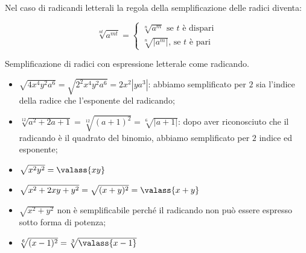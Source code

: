 Nel caso di radicandi letterali la regola della semplificazione delle radici 
diventa:

\begin{proposizione}
 \[\sqrt[nt]{a^{mt}}=\left\{\begin{array}{l}
   \sqrt[n]{a^m} \text{ se }t \text{ è dispari}\\
   \sqrt[n]{\left|a^m\right|}\text{, se }t\text{ è pari}
 \end{array}\right.\]
\end{proposizione}

\begin{exrig}
 \begin{esempio}
Semplificazione di radici con espressione letterale come radicando.
\begin{itemize}
\item $\sqrt{4x^4y^2a^6}=\sqrt{2^2x^4y^2a^6}=2x^2\left|ya^3\right|$: 
 abbiamo semplificato per $2$ sia l'indice della radice che l'esponente del 
 radicando;
\item $\sqrt[12]{a^2+2a+1}=\sqrt[12]{(a+1)^2}=\sqrt[6]{\left|a+1\right|}$: 
 dopo aver riconosciuto che il radicando è il quadrato del binomio, 
 abbiamo semplificato per $2$ indice ed esponente;
\item $\sqrt{x^2y^2}=\valass{xy}$
\item $\sqrt{x^2+2xy+y^2}=\sqrt{(x+y)^2}=\valass{x+y}$
\item $\sqrt{x^2+y^2}$ non è semplificabile perché il radicando non può essere 
 espresso sotto forma di potenza;
\item $\sqrt[6]{(x-1)^2}=\sqrt[3]{\valass{x-1}}$
\end{itemize}
 \end{esempio}
\end{exrig}

% 
% 
% 

